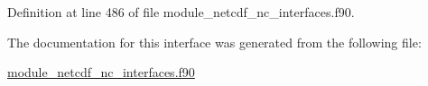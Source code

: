 Definition at line 486 of file module\+\_\+netcdf\+\_\+nc\+\_\+interfaces.\+f90.



The documentation for this interface was generated from the following file\+:\begin{DoxyCompactItemize}
\item 
\hyperlink{module__netcdf__nc__interfaces_8f90}{module\+\_\+netcdf\+\_\+nc\+\_\+interfaces.\+f90}\end{DoxyCompactItemize}
